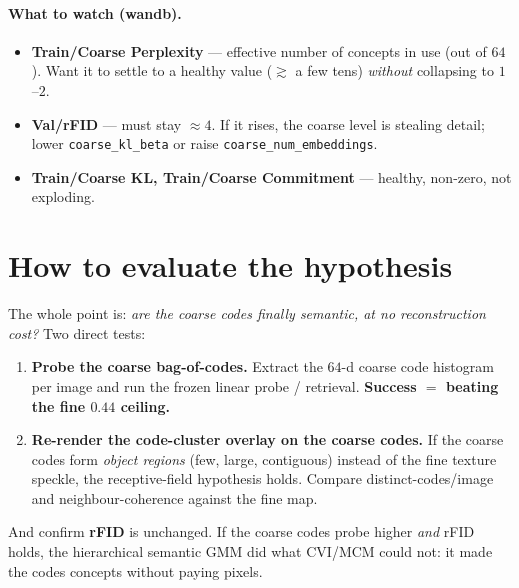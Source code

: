 \documentclass[11pt]{article}
\newcommand{\code}[1]{\texttt{#1}}
\begin{document}
\paragraph{What to watch (wandb).}
\begin{itemize}
  \item \textbf{Train/Coarse Perplexity} --- effective number of concepts in use (out of $64$). Want it
  to settle to a healthy value ($\gtrsim$ a few tens) \emph{without} collapsing to $1$--$2$.
  \item \textbf{Val/rFID} --- must stay $\approx$$4$. If it rises, the coarse level is stealing detail;
  lower \code{coarse\_kl\_beta} or raise \code{coarse\_num\_embeddings}.
  \item \textbf{Train/Coarse KL, Train/Coarse Commitment} --- healthy, non-zero, not exploding.
\end{itemize}

\section{How to evaluate the hypothesis}
The whole point is: \emph{are the coarse codes finally semantic, at no reconstruction cost?} Two direct tests:
\begin{enumerate}
  \item \textbf{Probe the coarse bag-of-codes.} Extract the $64$-d coarse code histogram per image and
  run the frozen linear probe / retrieval. \textbf{Success $=$ beating the fine $0.44$ ceiling.}
  \item \textbf{Re-render the code-cluster overlay on the coarse codes.} If the coarse codes form
  \emph{object regions} (few, large, contiguous) instead of the fine texture speckle, the receptive-field
  hypothesis holds. Compare distinct-codes/image and neighbour-coherence against the fine map.
\end{enumerate}
And confirm \textbf{rFID} is unchanged. If the coarse codes probe higher \emph{and} rFID holds, the
hierarchical semantic GMM did what CVI/MCM could not: it made the codes concepts without paying pixels.
\end{document}
